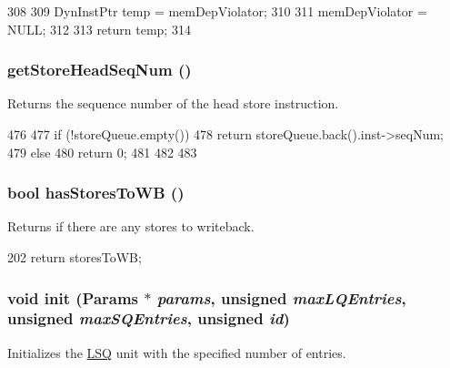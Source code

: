 \begin{DoxyCode}
308 {
309     DynInstPtr temp = memDepViolator;
310 
311     memDepViolator = NULL;
312 
313     return temp;
314 }
\end{DoxyCode}
\hypertarget{classOzoneLWLSQ_a1813b58ab7569d6aeefb5d4e235cceda}{
\subsubsection[{getStoreHeadSeqNum}]{ getStoreHeadSeqNum ()}}
\label{classOzoneLWLSQ_a1813b58ab7569d6aeefb5d4e235cceda}
Returns the sequence number of the head store instruction. 


\begin{DoxyCode}
476     {
477         if (!storeQueue.empty()) {
478             return storeQueue.back().inst->seqNum;
479         } else {
480             return 0;
481         }
482 
483     }
\end{DoxyCode}
\hypertarget{classOzoneLWLSQ_ad2e4b46255cfb53e85522adeed4e2089}{
\subsubsection[{hasStoresToWB}]{\setlength{\rightskip}{0pt plus 5cm}bool hasStoresToWB ()}}
\label{classOzoneLWLSQ_ad2e4b46255cfb53e85522adeed4e2089}
Returns if there are any stores to writeback. 


\begin{DoxyCode}
202 { return storesToWB; }
\end{DoxyCode}
\hypertarget{classOzoneLWLSQ_ae8565b0968a8115705f1585e8aa21f75}{
\subsubsection[{init}]{\setlength{\rightskip}{0pt plus 5cm}void init ({\bf Params} $\ast$ {\em params}, \/  unsigned {\em maxLQEntries}, \/  unsigned {\em maxSQEntries}, \/  unsigned {\em id})}}
\label{classOzoneLWLSQ_ae8565b0968a8115705f1585e8aa21f75}
Initializes the \hyperlink{classLSQ}{LSQ} unit with the specified number of entries. 


